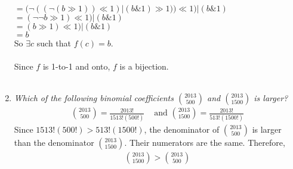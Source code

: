 \documentclass[12pt]{article}
\begin{document}
\begin{enumerate}
$=(\neg((\neg(b \gg 1))\ll1)|(b \& 1) \gg 1))\ll1)|(b \& 1)$ \\
$=(\neg\neg b \gg 1)\ll1)|(b \& 1)$ \\
$=(b \gg 1)\ll1)|(b \& 1)$ \\
$=b$ \\
So $\exists c$ such that $f(c) = b$. \\
\\
Since $f$ is 1-to-1 and onto, $f$ is a bijection. \\
\\



\item \emph{Which of the following binomial coefficients $\binom{2013}{500}$ and $\binom{2013}{1500}$ is larger?} \\
\begin{align*}
\displaystyle\binom{2013}{500} = \frac{2013!}{1513!(500!)} &\text{ and } \displaystyle\binom{2013}{1500} = \frac{2013!}{513!(1500!)}
\end{align*}
Since $1513!(500!) > 513!(1500!)$, the denominator of $\binom{2013}{500}$ is larger than the denominator $\binom{2013}{1500}$. Their numerators are the same. Therefore, \\
\begin{align*}
\displaystyle\binom{2013}{1500} > \binom{2013}{500}
\end{align*}
\\




\end{enumerate}
\end{document}
